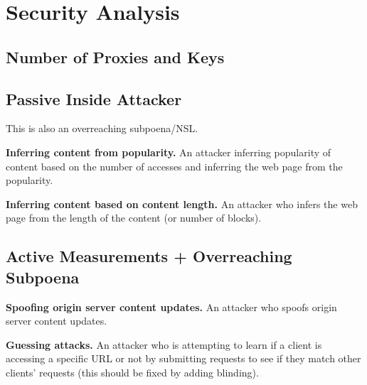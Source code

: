 \section{Security Analysis}
\label{sec:analysis}


\subsection{Number of Proxies and Keys}

\subsection{Passive Inside Attacker}
This is also an overreaching subpoena/NSL.

{\bf Inferring content from popularity.}
An attacker inferring popularity of content based on the number of accesses and inferring the web page from the popularity.

{\bf Inferring content based on content length.}
An attacker who infers the web page from the length of the content (or number of blocks).

\subsection{Active Measurements + Overreaching Subpoena}

{\bf Spoofing origin server content updates.}
An attacker who spoofs origin server content updates.

{\bf Guessing attacks.}
An attacker who is attempting to learn if a client is accessing a specific URL or not by submitting requests to see if they match other clients' requests (this should be fixed by adding blinding).
